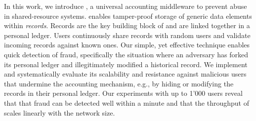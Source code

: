 






In this work, we introduce \ModelName{}, a universal accounting middleware to prevent abuse in shared-resource systems.
\ModelName{} enables tamper-proof storage of generic data elements within \emph{records}.
Records are the key building block of \ModelName{} and are linked together in a personal ledger.
Users continuously share records with random users and validate incoming records against known ones.
Our simple, yet effective technique enables quick detection of fraud, specifically the situation where an adversary has forked its personal ledger and illegitimately modified a historical record.
We implement \ModelName{} and systematically evaluate its scalability and resistance against malicious users that undermine the accounting mechanism, e.g., by hiding or modifying the records in their personal ledger.
Our experiments with up to 1'000 users reveal that \ModelName{} that fraud can be detected well within a minute and that the throughput of \ModelName{} scales linearly with the network size.


